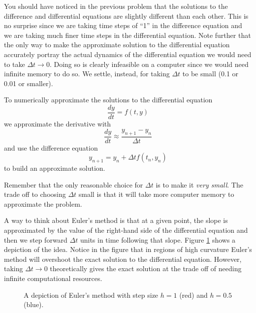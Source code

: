 You should have noticed in the previous problem that the solutions to the difference and
differential equations are slightly different than each other.  This is no surprise since
we are taking time steps of ``1'' in the difference equation and we are taking much finer
time steps in the differential equation.  Note further that the only way to make the
approximate solution to the differential equation accurately portray the actual dynamics
of the differential equation we would need to take $\Delta t \to 0$.  Doing so is clearly
infeasible on a computer since we would need infinite memory to do so.  We settle,
instead, for taking $\Delta t$ to be small (0.1 or 0.01 or smaller).  

\begin{definition}
    To numerically approximate the solutions to the differential equation
    \[ \frac{dy}{dt} = f(t,y) \]
    we approximate the derivative with 
    \[ \frac{dy}{dt} \approx \frac{y_{n+1} - y_n}{\Delta t} \]
    and use the difference equation
    \[ y_{n+1} = y_n + \Delta t f(t_n,y_n)  \]
    to build an approximate solution.  
\end{definition}
Remember that the only reasonable choice for
$\Delta t$ is to make it {\it very small}.  The trade off to choosing $\Delta t$ small
is that it will take more computer memory to approximate the problem.

A way to think about Euler's method is that at a given point, the slope is approximated by
the value of the right-hand side of the differential equation and then we step forward
$\Delta t$
units in time following that slope.  Figure \ref{fig:Euler} shows a depiction of the idea.
Notice in the figure that in regions of high curvature Euler's method will overshoot the
exact solution to the differential equation.  However, taking $\Delta t \to 0$ theoretically
gives the exact solution at the trade off of needing infinite computational resources.

\begin{figure}[ht!]
    \begin{center}
    \end{center}
    \caption{A depiction of Euler's method with step size $h=1$ (red) and $h=0.5$ (blue).}
    \label{fig:Euler}
\end{figure}


